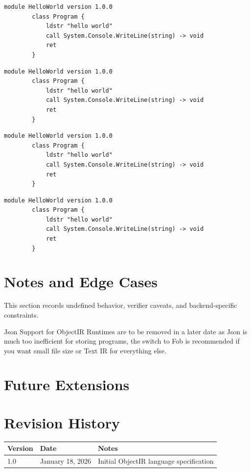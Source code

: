 \documentclass[11pt,a4paper]{article}
\begin{document}
		\begin{lstlisting}[language=ObjectIR]
		module HelloWorld version 1.0.0 
		class Program {
			ldstr "hello world"
			call System.Console.WriteLine(string) -> void
			ret
		}	
	\end{lstlisting}
	
		\begin{lstlisting}[language=ObjectIR]
		module HelloWorld version 1.0.0 
		class Program {
			ldstr "hello world"
			call System.Console.WriteLine(string) -> void
			ret
		}	
	\end{lstlisting}
	
		\begin{lstlisting}[language=ObjectIR]
		module HelloWorld version 1.0.0 
		class Program {
			ldstr "hello world"
			call System.Console.WriteLine(string) -> void
			ret
		}	
	\end{lstlisting}
	
		\begin{lstlisting}[language=ObjectIR]
		module HelloWorld version 1.0.0 
		class Program {
			ldstr "hello world"
			call System.Console.WriteLine(string) -> void
			ret
		}	
	\end{lstlisting}
	
	
	
	\section{Notes and Edge Cases}
	This section records undefined behavior, verifier caveats, and backend-specific constraints.
	
	Json Support for ObjectIR Runtimes are to be removed in a later date as Json is much too
	inefficient for storing programs, the switch to Fob is recommended if you want small file size or Text IR for everything else.
	
	
	\section{Future Extensions}
		
	\section{Revision History}
	\begin{longtable}{|l|l|p{8cm}|}
		\hline
		Version & Date & Notes \\
		\hline
		1.0 & January 18, 2026 & Initial ObjectIR language specification \\
		\hline
	\end{longtable}
	
\end{document}

